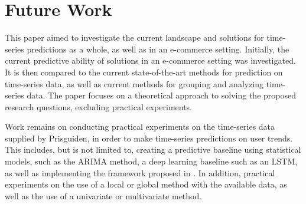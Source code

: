
\section{Future Work}
\label{sections:Discussion:FutureWork}


This paper aimed to investigate the current landscape and solutions for time-series predictions as a whole,
as well as in an e-commerce setting.
Initially, the current predictive ability of solutions in an e-commerce setting was investigated.
It is then compared to the current state-of-the-art methods for prediction on time-series data,
as well as current methods for grouping and analyzing time-series data.
The paper focuses on a theoretical approach to solving the proposed research questions,
excluding practical experiments.

Work remains on conducting practical experiments on the time-series data supplied by Prisguiden,
in order to make time-series predictions on user trends.
This includes, but is not limited to, creating a predictive baseline using statistical models, such as the ARIMA method, a deep learning baseline such as an LSTM,
as well as implementing the framework proposed in .
In addition, practical experiments on the use of a local or global method with the available data,
as well as the use of a univariate or multivariate method.

